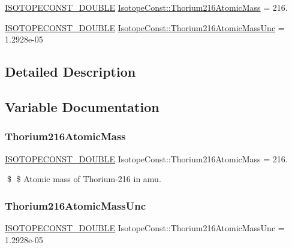 \begin{DoxyCompactItemize}
\item 
\mbox{\hyperlink{group___isotope_const-_macros_ga8f45a7272ce02c0b4c65c44636ed719a}{I\+S\+O\+T\+O\+P\+E\+C\+O\+N\+S\+T\+\_\+\+D\+O\+U\+B\+LE}} \mbox{\hyperlink{group___isotope_const-_thorium-_th216_ga6973b01dad9775bdf97cea82a8a7bfb7}{Isotope\+Const\+::\+Thorium216\+Atomic\+Mass}} = 216.
\item 
\mbox{\hyperlink{group___isotope_const-_macros_ga8f45a7272ce02c0b4c65c44636ed719a}{I\+S\+O\+T\+O\+P\+E\+C\+O\+N\+S\+T\+\_\+\+D\+O\+U\+B\+LE}} \mbox{\hyperlink{group___isotope_const-_thorium-_th216_ga5701913276ad82da8a4b5132d87efa85}{Isotope\+Const\+::\+Thorium216\+Atomic\+Mass\+Unc}} = 1.\+2928e-\/05
\end{DoxyCompactItemize}


\subsection{Detailed Description}


\subsection{Variable Documentation}
\mbox{\label{group___isotope_const-_thorium-_th216_ga6973b01dad9775bdf97cea82a8a7bfb7}} 
\subsubsection{\texorpdfstring{Thorium216\+Atomic\+Mass}{Thorium216AtomicMass}}
{\footnotesize\ttfamily \mbox{\hyperlink{group___isotope_const-_macros_ga8f45a7272ce02c0b4c65c44636ed719a}{I\+S\+O\+T\+O\+P\+E\+C\+O\+N\+S\+T\+\_\+\+D\+O\+U\+B\+LE}} Isotope\+Const\+::\+Thorium216\+Atomic\+Mass = 216.}

\$ \$ Atomic mass of Thorium-\/216 in amu. \mbox{\label{group___isotope_const-_thorium-_th216_ga5701913276ad82da8a4b5132d87efa85}} 
\subsubsection{\texorpdfstring{Thorium216\+Atomic\+Mass\+Unc}{Thorium216AtomicMassUnc}}
{\footnotesize\ttfamily \mbox{\hyperlink{group___isotope_const-_macros_ga8f45a7272ce02c0b4c65c44636ed719a}{I\+S\+O\+T\+O\+P\+E\+C\+O\+N\+S\+T\+\_\+\+D\+O\+U\+B\+LE}} Isotope\+Const\+::\+Thorium216\+Atomic\+Mass\+Unc = 1.\+2928e-\/05}

